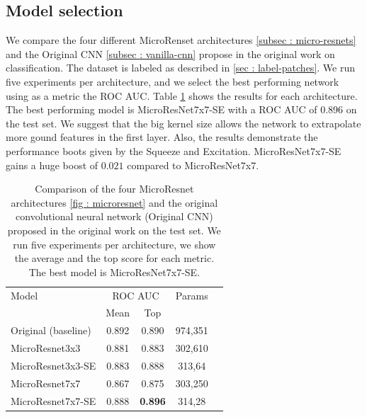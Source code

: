 \documentclass[../document.tex]{subfiles}
\begin{document}
\subsection{Model selection}
We compare the four different MicroRenset architectures \ref{subsec : micro-resnets} and the Original CNN \ref{subsec : vanilla-cnn} propose in the original work \cite{omar2018traversability} on classification. The dataset is labeled as described in \ref{sec : label-patches}. We run five experiments per architecture, and we select the best performing network using as a metric the ROC AUC. Table \ref{tab : models-results-comparison} shows the results for each architecture. The best performing model is MicroResNet7x7-SE with a ROC AUC of 0.896 on the test set. We suggest that the big kernel size allows the network to extrapolate more gound features in the first layer. Also, the results demonstrate the performance boots given by the Squeeze and Excitation. MicroResNet7x7-SE  gains a huge boost of $0.021$ compared to MicroResNet7x7.
\begin{table}[ht]
  \centering
  \begin{tabular}{@{}lcccc@{}}
    \toprule
    Model & \multicolumn{2}{c}{ROC AUC} & Params \\ 
    \cline{1-4}
    & Mean & Top &  \\ 
    \cline{1-4}
    Original (baseline)  & 0.892& 0.890 &  974,351 \\
    MicroResnet3x3 & 0.881 & 0.883 & 302,610 \\
    MicroResnet3x3-SE & 0.883 & 0.888 & 313,64\\
    MicroResnet7x7 & 0.867 & 0.875 &  303,250\\
    MicroResnet7x7-SE &0.888 & \textbf{0.896} & 314,28\\
    \bottomrule   
  \end{tabular}
  \caption{Comparison of the four MicroResnet architectures \ref{fig : microresnet} and the original convolutional neural network (Original CNN) proposed in the original work \cite{omar2018traversability} on the test set. We run five experiments per architecture, we show the average and the top score for each metric. The best model is MicroResNet7x7-SE.}
  \label{tab : models-results-comparison}
\end{table}
\end{document}

